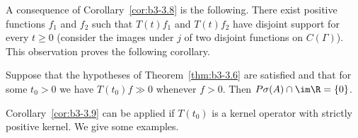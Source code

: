 A consequence of Corollary~\ref{cor:b3-3.8} is the following. 
There exist positive functions $f_{1}$ and $f_{2}$ such that $T(t)f_{1}$ and $T(t)f_{2}$ have disjoint support for every $t \geq 0$ (consider the images under $j$ of two disjoint functions on $C(\Gamma)$).
This observation proves the following corollary.
\begin{corollary}\label{cor:b3-3.9}

	Suppose that the hypotheses of Theorem~\ref{thm:b3-3.6} are satisfied and that for some $t_{0} > 0$ we have $T(t_{0})f \gg 0$ whenever $f > 0$.
	Then $P\sigma(A)\cap \im\R = \{0\}$.
\end{corollary}
Corollary~\ref{cor:b3-3.9} can be applied if\/ $T(t_{0})$ is a kernel operator%
with strictly positive kernel.
We give some examples.

